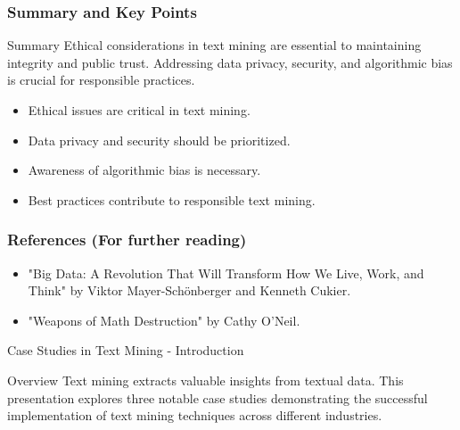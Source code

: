 \documentclass[aspectratio=169]{beamer}
\begin{document}
\begin{frame}[fragile]
    \frametitle{Summary and Key Points}
    \begin{block}{Summary}
        Ethical considerations in text mining are essential to maintaining integrity and public trust. 
        Addressing data privacy, security, and algorithmic bias is crucial for responsible practices.
    \end{block}

    \begin{itemize}
        \item Ethical issues are critical in text mining.
        \item Data privacy and security should be prioritized.
        \item Awareness of algorithmic bias is necessary.
        \item Best practices contribute to responsible text mining.
    \end{itemize}
\end{frame}

\begin{frame}[fragile]
    \frametitle{References (For further reading)}
    \begin{itemize}
        \item "Big Data: A Revolution That Will Transform How We Live, Work, and Think" by Viktor Mayer-Schönberger and Kenneth Cukier.
        \item "Weapons of Math Destruction" by Cathy O'Neil.
    \end{itemize}
\end{frame}

\begin{frame}[fragile]{Case Studies in Text Mining - Introduction}
    \begin{block}{Overview}
        Text mining extracts valuable insights from textual data. This presentation explores three notable case studies demonstrating the successful implementation of text mining techniques across different industries.
    \end{block}
\end{frame}
\end{document}
